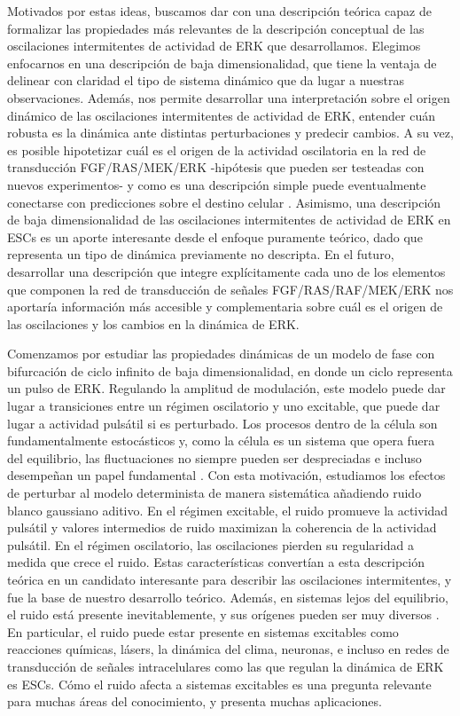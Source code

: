\documentclass[./main.tex]{subfiles}
\begin{document}
Motivados por estas ideas, buscamos dar con una descripción teórica capaz de formalizar las propiedades más relevantes de la descripción conceptual de las oscilaciones intermitentes de actividad de ERK que desarrollamos. Elegimos enfocarnos en una descripción de baja dimensionalidad, que tiene la ventaja de delinear con claridad el tipo de sistema dinámico que da lugar a nuestras observaciones. Además, nos permite desarrollar una interpretación sobre el origen dinámico de las oscilaciones intermitentes de actividad de ERK, entender cuán robusta es la dinámica ante distintas perturbaciones y predecir cambios. A su vez, es posible hipotetizar cuál es el origen de la actividad oscilatoria en la red de transducción FGF/RAS/MEK/ERK -hipótesis que pueden ser testeadas con nuevos experimentos- y como es una descripción simple puede eventualmente conectarse con predicciones sobre el destino celular \cite{Dessauges2017,Casani2022}. Asimismo, una descripción de baja dimensionalidad de las oscilaciones intermitentes de actividad de ERK en ESCs es un aporte interesante desde el enfoque puramente teórico, dado que representa un tipo de dinámica previamente no descripta. En el futuro, desarrollar una descripción que integre explícitamente cada uno de los elementos que componen la red de transducción de señales FGF/RAS/RAF/MEK/ERK nos aportaría información más accesible y complementaria sobre cuál es el origen de las oscilaciones y los cambios en la dinámica de ERK. 


Comenzamos por estudiar las propiedades dinámicas de un modelo de fase con bifurcación de ciclo infinito de baja dimensionalidad, en donde un ciclo representa un pulso de ERK. Regulando la amplitud de modulación, este modelo puede dar lugar a transiciones entre un régimen oscilatorio y uno excitable, que puede dar lugar a actividad pulsátil si es perturbado. Los procesos dentro de la célula son fundamentalmente estocásticos y, como la célula es un sistema que opera fuera del equilibrio, las fluctuaciones no siempre pueden ser despreciadas e incluso desempeñan un papel fundamental \cite{Tsimiring2014}. Con esta motivación, estudiamos los efectos de perturbar al modelo determinista de manera sistemática añadiendo ruido blanco gaussiano aditivo. En el régimen excitable, el ruido promueve la actividad pulsátil y valores intermedios de ruido maximizan la coherencia de la actividad pulsátil. En el régimen oscilatorio, las oscilaciones pierden su regularidad a medida que crece el ruido. Estas características convertían a esta descripción teórica en un candidato interesante para describir las oscilaciones intermitentes, y fue la base de nuestro desarrollo teórico. Además, en sistemas lejos del equilibrio, el ruido está presente inevitablemente, y sus orígenes pueden ser muy diversos \cite{Lindner2004}. En particular, el ruido puede estar presente en sistemas excitables como reacciones químicas, lásers, la dinámica del clima, neuronas, e incluso en redes de transducción de señales intracelulares como las que regulan la dinámica de ERK es ESCs. Cómo el ruido afecta a sistemas excitables es una pregunta relevante para muchas áreas del conocimiento, y presenta muchas aplicaciones.
\end{document}
